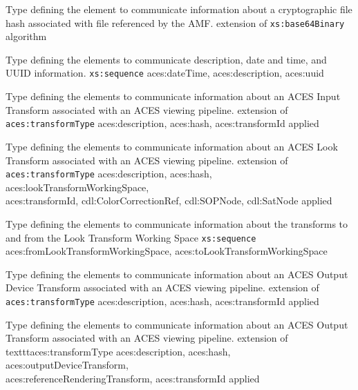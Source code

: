             {Type defining the element to communicate information about a cryptographic file hash associated with file referenced by the AMF.}
            {extension of \texttt{xs:base64Binary}}
            {algorithm}
            
            {Type defining the elements to communicate description, date and time, and UUID information.}
            {\texttt{xs:sequence}}
            {aces:dateTime, aces:description, aces:uuid}
            
                {Type defining the elements to communicate information about an ACES Input Transform associated with an ACES viewing pipeline.}
                {extension of \texttt{aces:transformType}}
                {aces:description, aces:hash, aces:transformId}
                {applied}
        
                {Type defining the elements to communicate information about an ACES Look Transform associated with an ACES viewing pipeline.}
                {extension of \texttt{aces:transformType}}
                {aces:description, aces:hash, aces:lookTransformWorkingSpace,\\ aces:transformId, cdl:ColorCorrectionRef, cdl:SOPNode, cdl:SatNode}
                {applied}
                
                {Type defining the elements to communicate information about the transforms to and from the Look Transform Working Space}
                {\texttt{xs:sequence}}
                {aces:fromLookTransformWorkingSpace, aces:toLookTransformWorkingSpace}
                
                {Type defining the elements to communicate information about an ACES Output Device Transform associated with an ACES viewing pipeline.}
                {extension of \texttt{aces:transformType}}
                {aces:description, aces:hash, aces:transformId}
                {applied}

                {Type defining the elements to communicate information about an ACES Output Transform associated with an ACES viewing pipeline.}
                {extension of texttt{aces:transformType}}
                {aces:description, aces:hash, aces:outputDeviceTransform,\\ aces:referenceRenderingTransform, aces:transformId}
                {applied}

